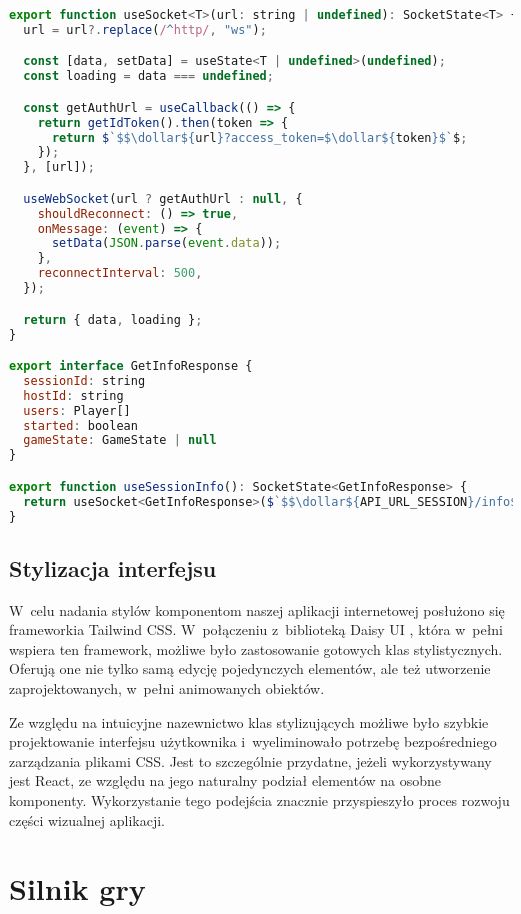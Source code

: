 \vspace*{0.5cm}

\begin{lstlisting}[language=JavaScript, caption=Hooki z WebSocketem, label={lst:websocket-hooks}, captionpos=b]
export function useSocket<T>(url: string | undefined): SocketState<T> {
  url = url?.replace(/^http/, "ws");

  const [data, setData] = useState<T | undefined>(undefined);
  const loading = data === undefined;

  const getAuthUrl = useCallback(() => {
    return getIdToken().then(token => {
      return $`$$\dollar${url}?access_token=$\dollar${token}$`$;
    });
  }, [url]);

  useWebSocket(url ? getAuthUrl : null, {
    shouldReconnect: () => true,
    onMessage: (event) => {
      setData(JSON.parse(event.data));
    },
    reconnectInterval: 500,
  });

  return { data, loading };
}  

export interface GetInfoResponse {
  sessionId: string
  hostId: string
  users: Player[]
  started: boolean
  gameState: GameState | null
}

export function useSessionInfo(): SocketState<GetInfoResponse> {
  return useSocket<GetInfoResponse>($`$$\dollar${API_URL_SESSION}/info$`$);
}

\end{lstlisting}

\subsection{Stylizacja interfejsu}
W~celu nadania stylów komponentom naszej aplikacji internetowej posłużono się
frameworkia Tailwind CSS. W~połączeniu z~biblioteką Daisy UI
\cite{DaisyUI}, która
w~pełni wspiera ten framework, możliwe było zastosowanie gotowych klas
stylistycznych. Oferują one nie tylko samą edycję pojedynczych elementów, ale też
utworzenie zaprojektowanych, w~pełni animowanych obiektów.

Ze względu na intuicyjne nazewnictwo klas stylizujących możliwe było szybkie
projektowanie interfejsu użytkownika i~wyeliminowało
potrzebę bezpośredniego zarządzania plikami CSS. Jest to szczególnie
przydatne, jeżeli wykorzystywany jest React, ze względu na jego naturalny podział
elementów na osobne komponenty. Wykorzystanie tego podejścia znacznie przyspieszyło
proces rozwoju części wizualnej aplikacji.


\section{Silnik gry}
\label{subsec:silnik_gry}


